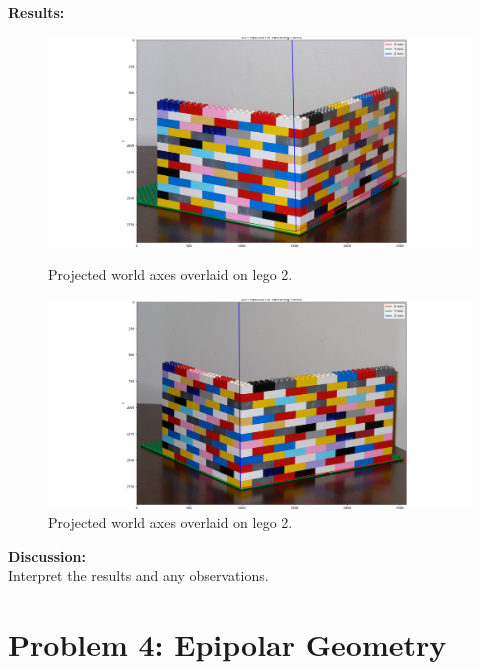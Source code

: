 \documentclass{article}
\begin{document}
\textbf{Results:} \\
\begin{figure}[h]
  \centering
  \begin{minipage}{0.45\textwidth}
      \centering
      \includegraphics[width=\textwidth]{Figure_5.png}
      \caption{Projected world axes overlaid on lego 2.}
      \label{fig:image1}
  \end{minipage}\hfill
  \begin{minipage}{0.45\textwidth}
      \centering
      \includegraphics[width=\textwidth]{Figure_6.png}
      \caption{Projected world axes overlaid on lego 2.}
      \label{fig:image2}
  \end{minipage}
  \label{fig:side_by_side}
\end{figure}
\textbf{Discussion:} \\
Interpret the results and any observations.

\section{Problem 4: Epipolar Geometry}
\end{document}
